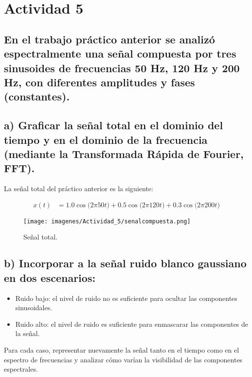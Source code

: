 \section{Actividad 5}

\subsection*{En el trabajo práctico anterior se analizó espectralmente una señal compuesta por tres 
sinusoides de frecuencias 50 Hz, 120 Hz y 200 Hz, con diferentes amplitudes y fases 
(constantes).}

\subsection*{a) Graficar la señal total en el dominio del tiempo y en el dominio de la frecuencia 
(mediante la Transformada Rápida de Fourier, FFT).} 

La señal total del práctico anterior es la siguiente:

\[
      \begin{aligned}
            x(t) &= 1.0 \cos\!\bigl(2\pi 50 t\bigr)
                  + 0.5 \cos\!\bigl(2\pi 120 t\bigr)
                  + 0.3 \cos\!\bigl(2\pi 200 t\bigr)
      \end{aligned}
\]

\bigskip
      \begin{figure}[H]
            \centering
            \texttt{[image: imagenes/Actividad\_5/senalcompuesta.png]}
            \caption{Señal total.}
      \end{figure}
\bigskip

\subsection*{b) Incorporar a la señal ruido blanco gaussiano en dos escenarios:}

\begin{itemize}
    \item Ruido bajo: el nivel de ruido no es suficiente para ocultar las componentes sinusoidales.
    \item Ruido alto: el nivel de ruido es suficiente para enmascarar las componentes de la señal.
\end{itemize}

Para cada caso, representar nuevamente la señal tanto en el tiempo como en el espectro de frecuencias y analizar cómo varían la 
visibilidad de las componentes espectrales. \par

